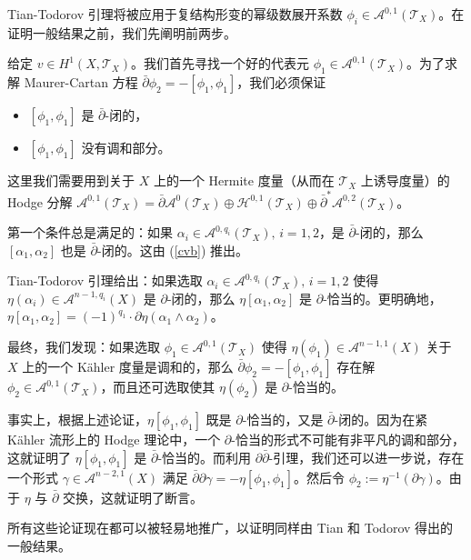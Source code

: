 Tian-Todorov 引理将被应用于复结构形变的幂级数展开系数 $\phi_i\in \mathcal{A}^{0,1}(\mathcal{T}_X)$。在证明一般结果之前，我们先阐明前两步。

给定 $v\in H^1(X,\mathcal{T}_X)$。我们首先寻找一个好的代表元 $\phi_1\in\mathcal{A}^{0,1}(\mathcal{T}_X)$。为了求解 Maurer-Cartan 方程 $\bar{\partial}\phi_2=-[\phi_1,\phi_1]$，我们必须保证\begin{itemize}
    \item $[\phi_1,\phi_1]$ 是 $\bar{\partial}$-闭的，
    \item $[\phi_1,\phi_1]$ 没有调和部分。
\end{itemize}

这里我们需要用到关于 $X$ 上的一个 Hermite 度量（从而在 $\mathcal{T}_X$ 上诱导度量）的 Hodge 分解 $\mathcal{A}^{0,1}(\mathcal{T}_X)=\bar{\partial}\mathcal{A}^{0}(\mathcal{T}_X)\oplus\mathcal{H}^{0,1}(\mathcal{T}_X)\oplus\bar{\partial}^*\mathcal{A}^{0,2}(\mathcal{T}_X)$。

第一个条件总是满足的：如果 $\alpha_i\in\mathcal{A}^{0,q_i}(\mathcal{T}_X),\, i=1,2$，是 $\bar{\partial}$-闭的，那么 $[\alpha_1,\alpha_2]$ 也是 $\bar{\partial}$-闭的。这由 (\ref{cvb}) 推出。

Tian-Todorov 引理给出：如果选取 $\alpha_i\in\mathcal{A}^{0,q_i}(\mathcal{T}_X),\, i=1,2$ 使得 $\eta(\alpha_i)\in\mathcal{A}^{n-1,q_i}(X)$ 是 $\partial$-闭的，那么 $\eta[\alpha_1,\alpha_2]$ 是 $\partial$-恰当的。更明确地，$\eta[\alpha_1,\alpha_2]=(-1)^{q_1}\cdot \partial\eta(\alpha_1 \wedge\alpha_2)$。

最终，我们发现：如果选取 $\phi_1\in \mathcal{A}^{0,1}(\mathcal{T}_X)$ 使得 $\eta(\phi_1)\in\mathcal{A}^{n-1,1}(X)$ 关于 $X$ 上的一个 Kähler 度量是调和的，那么 $\bar{\partial}\phi_2=-[\phi_1,\phi_1]$ 存在解 $\phi_2\in\mathcal{A}^{0,1}(\mathcal{T}_X)$，而且还可选取使其 $\eta(\phi_2)$ 是 $\partial$-恰当的。

事实上，根据上述论证，$\eta[\phi_1,\phi_1]$ 既是 $\partial$-恰当的，又是 $\bar{\partial}$-闭的。因为在紧 Kähler 流形上的 Hodge 理论中，一个 $\partial$-恰当的形式不可能有非平凡的调和部分，这就证明了 $\eta[\phi_1,\phi_1]$ 是 $\bar{\partial}$-恰当的。而利用 $\partial\bar{\partial}$-引理，我们还可以进一步说，存在一个形式 $\gamma\in\mathcal{A}^{n-2,1}(X)$ 满足 $\bar{\partial}\partial\gamma=-\eta[\phi_1,\phi_1]$。然后令 $\phi_2:=\eta^{-1}(\partial\gamma)$。由于 $\eta$ 与 $\bar{\partial}$ 交换，这就证明了断言。

所有这些论证现在都可以被轻易地推广，以证明同样由 Tian 和 Todorov 得出的一般结果。

